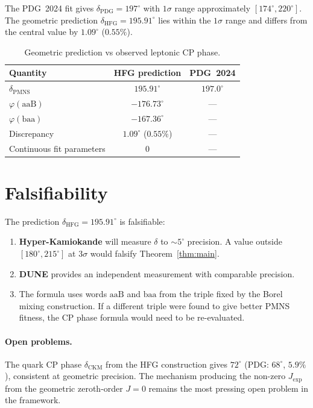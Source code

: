 \documentclass[11pt,a4paper]{article}
\theoremstyle{definition}
\theoremstyle{remark}
\begin{document}
The PDG~2024 fit gives $\delta_{\mathrm{PDG}}=197^\circ$ with
$1\sigma$ range approximately $[174^\circ,220^\circ]$.
The geometric prediction $\delta_{\mathrm{HFG}}=195.91^\circ$
lies within the $1\sigma$ range and differs from the central value
by $1.09^\circ$ ($0.55\%$).

\begin{table}[htbp]
\centering
\caption{Geometric prediction vs observed leptonic CP phase.}
\label{tab:comparison}
\begin{tabular}{lcc}
\toprule
Quantity & HFG prediction & PDG~2024 \\
\midrule
$\delta_{\mathrm{PMNS}}$ & $195.91^\circ$ & $197.0^\circ$ \\
$\varphi(\mathrm{aaB})$ & $-176.73^\circ$ & --- \\
$\varphi(\mathrm{baa})$ & $-167.36^\circ$ & --- \\
Discrepancy & $1.09^\circ$ ($0.55\%$) & --- \\
Continuous fit parameters & 0 & --- \\
\bottomrule
\end{tabular}
\end{table}

\section{Falsifiability}
\label{sec:predictions}

The prediction $\delta_{\mathrm{HFG}}=195.91^\circ$ is falsifiable:
\begin{enumerate}[(1)]
\item \textbf{Hyper-Kamiokande} will measure $\delta$ to
  $\sim5^\circ$ precision.
  A value outside $[180^\circ,215^\circ]$ at $3\sigma$ would
  falsify Theorem~\ref{thm:main}.
\item \textbf{DUNE} provides an independent measurement with
  comparable precision.
\item The formula uses words $\mathrm{aaB}$ and $\mathrm{baa}$
  from the triple fixed by the Borel mixing construction.
  If a different triple were found to give better PMNS fitness,
  the CP phase formula would need to be re-evaluated.
\end{enumerate}

\paragraph{Open problems.}
The quark CP phase $\delta_{\mathrm{CKM}}$ from the HFG
construction gives $72^\circ$ (PDG: $68^\circ$, $5.9\%$),
consistent at geometric precision.
The mechanism producing the non-zero $J_\mathrm{exp}$ from the
geometric zeroth-order $J=0$ remains the most pressing open
problem in the framework.
\end{document}
